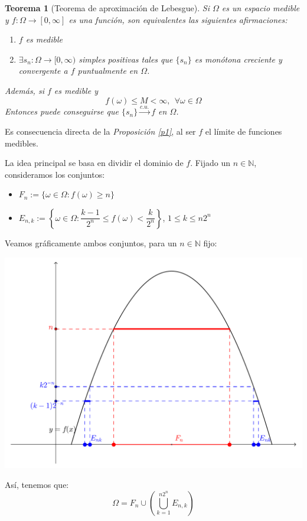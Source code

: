 \documentclass[11pt, a4paper]{article}
\makeatletter
\newif\IfInSansMode
\let\oldsf\sffamily
\renewcommand*{\sffamily}{\oldsf\mathversion{sans}\InSansModetrue}
\let\oldnorm\normalfont
\renewcommand*{\normalfont}{\oldnorm\InSansModefalse\mathversion{normal}}
\renewenvironment{proof}[1][\proofname] {\par\pushQED{\qed}\normalfont\topsep6\p@\@plus6\p@\relax\trivlist\item[\hskip\labelsep\itshape\sffamily#1\@addpunct{.}]\ignorespaces}{\popQED\endtrivlist\@endpefalse}
\theoremstyle{theorem-style}
\newtheorem{nth}{Teorema}[section]
\theoremstyle{definition-style}
\theoremstyle{remark-style}
\theoremstyle{example-style}
\newenvironment{nlist}
{\begin{enumerate}
    \renewcommand\labelenumi{(\emph{\roman{enumi})}}}
  {\end{enumerate}}
\makeatother
\begin{document}
\begin{nth}[Teorema de aproximación de Lebesgue]
  Si $\Omega$ es un espacio medible y $f:\Omega \to [0,\infty]$ es una función, son equivalentes las siguientes afirmaciones:
  \begin{nlist}
  \item $f$ es medible
  \item $\exists s_n : \Omega \to [0,\infty)$ simples positivas tales que $\{s_n\}$ es monótona creciente y convergente a $f$ puntualmente en $\Omega$.
  \end{nlist}
  Además, si $f$ es medible y
  \[
    f(\omega) \leq M < \infty, \ \ \forall \omega \in \Omega
  \]
  Entonces puede conseguirse que $\{s_n\}\xrightarrow{c.u.}f$ en $\Omega$.
\end{nth}
\begin{proof}\hfill

  Es consecuencia directa de la \textit{Proposición \ref{p1}}, al ser $f$ el límite de funciones medibles.
  
   La idea principal se basa en dividir el dominio de $f$. Fijado un $n \in \mathbb{N}$, consideramos los conjuntos: 
    \begin{itemize}
      \item $F_n := \{\omega \in \Omega : f(\omega) \geq n\}$\\
      \item $E_{n,k} := \left\{\omega \in \Omega : \dfrac{k-1}{2^n} \leq f(\omega) < \dfrac{k}{2^n}\right\}$,  $1 \leq k \leq n2^n$\\
    \end{itemize}
  
  Veamos gráficamente ambos conjuntos, para un $n\in \mathbb{N}$ fijo:
  \begin{center}
	\includegraphics[ext=.pdf,height=13.5\baselineskip]{thLebesgue.pdf}
  \end{center}
  Así, tenemos que:
  \[
    \Omega = F_n \cup \left( \bigcup_{k=1}^{n2^n}E_{n,k} \right)
  \]
  

\end{proof}
\end{document}
